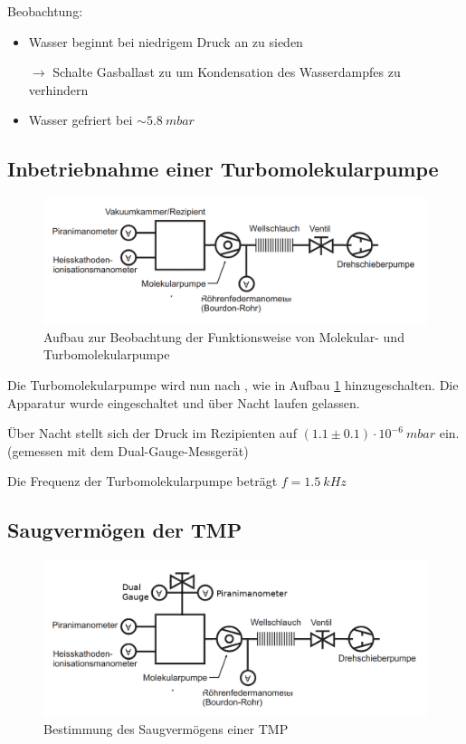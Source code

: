 \documentclass[12pt, a4paper]{scrartcl}
\begin{document}
		Beobachtung:
		\begin{itemize}
			\item Wasser beginnt bei niedrigem Druck an zu sieden
			
			$\rightarrow$ Schalte Gasballast zu um Kondensation des Wasserdampfes zu verhindern			
			
			\item Wasser gefriert bei $\sim 5.8\ mbar$
			
		\end{itemize}

	
	\subsection{Inbetriebnahme einer Turbomolekularpumpe}
	
        \begin{figure}[H]
            \centering
            \includegraphics[width=.55\paperwidth]{aufbau23}
            \caption{Aufbau zur Beobachtung der Funktionsweise von Molekular- und Turbomolekularpumpe}
            \label{fig:anord3}
        \end{figure}
    
    	Die Turbomolekularpumpe wird nun nach \cite{skript}, wie in Aufbau \ref{fig:anord3} hinzugeschalten. Die Apparatur wurde eingeschaltet und über Nacht laufen gelassen.
    	
    	Über Nacht stellt sich der Druck im Rezipienten auf 
        $(1.1\pm0.1)\cdot 10^{-6}\ mbar$
        ein. (gemessen mit dem Dual-Gauge-Messgerät)
        
        Die Frequenz der Turbomolekularpumpe beträgt $f = 1.5\ kHz$
    
    
    \subsection{Saugvermögen der TMP}
    
        \begin{figure}[H]
            \centering
            \includegraphics[width=.55\paperwidth]{aufbau24}
            \caption{Bestimmung des Saugvermögens einer TMP}
            \label{fig:anord4}
        \end{figure}
    
\end{document}
